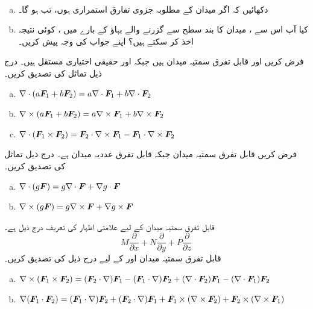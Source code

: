 \\
\begin{enumerate}[a.]
\item
دکھائیں  کہ اگر  میدان  کے مطلوبہ جزوی تفارق استمراری  ہوں، تب  ہو گا۔
\item
کیا آپ اس سے  ، میدان  کا بند سطح سے گزرنے والے  بہاؤ کے بارے میں ،  کوئی   نتیجہ اخذ  کر  سکتے ہیں؟ اپنے جواب کی وجہ پیش کریں۔
\end{enumerate}
فرض کریں  اور   قابل تفرق سمتیہ میدان ہیں جبکہ  اور   حقیقی اختیاری مستقل ہیں۔ درج ذیل تماثل کی تصدیق کریں۔
\begin{enumerate}[a.]
\item
\(\nabla\cdot(a{{\boldsymbol{F}}}_1+b{{\boldsymbol{F}}}_2)=a\nabla\cdot{\ensuremath{{\boldsymbol{F}}}}_1+b\nabla\cdot{\ensuremath{{\boldsymbol{F}}}}_2\)
\item
\(\nabla\times(a{{\boldsymbol{F}}}_1+b{{\boldsymbol{F}}}_2)=a\nabla\times{\ensuremath{{\boldsymbol{F}}}}_1+b\nabla\times{\ensuremath{{\boldsymbol{F}}}}_2\)
\item
\(\nabla\cdot({{\boldsymbol{F}}}_1\times{\ensuremath{{\boldsymbol{F}}}}_2)={{\boldsymbol{F}}}_2\cdot\nabla\times{\ensuremath{{\boldsymbol{F}}}}_1-{{\boldsymbol{F}}}_1\cdot\nabla\times{\ensuremath{{\boldsymbol{F}}}}_2\)
\end{enumerate}
فرض کریں  قابل تفرق سمتیہ میدان  جبکہ   قابل تفرق عددیہ میدان ہے۔ درج ذیل تماثل کی تصدیق کریں۔
\begin{enumerate}[a.]
\item
\(\nabla\cdot(g{{\boldsymbol{F}}})=g\nabla\cdot{\ensuremath{{\boldsymbol{F}}}}+\nabla g\cdot {\ensuremath{{\boldsymbol{F}}}}\)
\item
\(\nabla\times(g{{\boldsymbol{F}}})=g\nabla\times{\ensuremath{{\boldsymbol{F}}}}+\nabla g\times{\ensuremath{{\boldsymbol{F}}}}\)
\end{enumerate}
قابل تفرق سمتیہ میدان  کے لیے علامتی اظہار   کی تعریف درج ذیل ہے۔
\[M\frac{\partial}{\partial x}+N\frac{\partial}{\partial y}+P\frac{\partial}{\partial z}\]
قابل تفرق سمتیہ میدان  اور  کے لیے درج ذیل کی تصدیق کریں۔
\begin{enumerate}[a.]
\item
\(\nabla\times({{\boldsymbol{F}}}_1\times{\ensuremath{{\boldsymbol{F}}}}_2)=({{\boldsymbol{F}}}_2\cdot\nabla){{\boldsymbol{F}}}_1-({{\boldsymbol{F}}}_1\cdot\nabla){{\boldsymbol{F}}}_2+(\nabla\cdot{\ensuremath{{\boldsymbol{F}}}}_2){{\boldsymbol{F}}}_1-(\nabla\cdot{\ensuremath{{\boldsymbol{F}}}}_1){{\boldsymbol{F}}}_2\)
\item
\(\nabla({{\boldsymbol{F}}}_1\cdot{\ensuremath{{\boldsymbol{F}}}}_2)=({{\boldsymbol{F}}}_1\cdot\nabla){{\boldsymbol{F}}}_2+({{\boldsymbol{F}}}_2\cdot\nabla){{\boldsymbol{F}}}_1+{{\boldsymbol{F}}}_1\times(\nabla\times{\ensuremath{{\boldsymbol{F}}}}_2)+{{\boldsymbol{F}}}_2\times(\nabla\times{\ensuremath{{\boldsymbol{F}}}}_1)\)
\end{enumerate}

